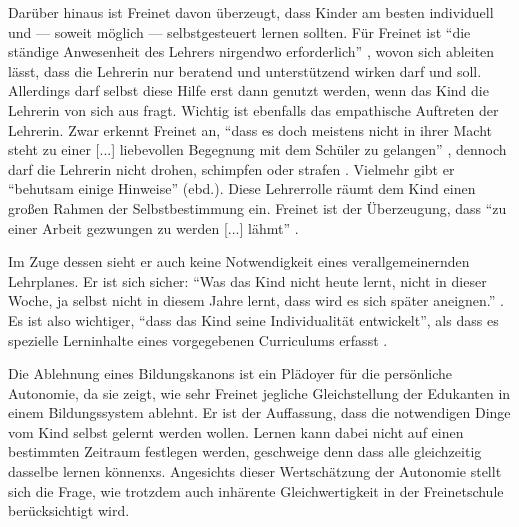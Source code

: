 Darüber hinaus ist Freinet davon überzeugt, dass Kinder am besten individuell und --- soweit möglich --- selbstgesteuert lernen sollten.
Für Freinet ist ``die ständige Anwesenheit des Lehrers nirgendwo erforderlich'' \parencite[105]{Freinet1979}, wovon sich ableiten lässt, dass die Lehrerin nur beratend und unterstützend wirken darf und soll.
Allerdings darf selbst diese Hilfe erst dann genutzt werden, wenn das Kind die Lehrerin von sich aus fragt.
Wichtig ist ebenfalls das empathische Auftreten der Lehrerin.
Zwar erkennt Freinet an, ``dass es doch meistens nicht in ihrer Macht steht zu einer [...] liebevollen Begegnung mit dem Schüler zu gelangen'' \parencite[101]{Freinet1979}, dennoch darf die Lehrerin nicht drohen, schimpfen oder strafen \parencite[103]{Freinet1979}.
Vielmehr gibt er ``behutsam einige Hinweise'' (ebd.).
Diese Lehrerrolle räumt dem Kind einen großen Rahmen der Selbstbestimmung ein.
Freinet ist der Überzeugung, dass ``zu einer Arbeit gezwungen zu werden [...] lähmt'' \parencite[vgl.][495]{Freinet-2000a}.

Im Zuge dessen sieht er auch keine Notwendigkeit eines verallgemeinernden Lehrplanes.
Er ist sich sicher: ``Was das Kind nicht heute lernt, nicht in dieser Woche, ja selbst nicht in diesem Jahre lernt, dass wird es sich später aneignen.'' \parencite[101]{Freinet1979}.
Es ist also wichtiger, ``dass das Kind seine Individualität entwickelt'', als dass es spezielle Lerninhalte eines vorgegebenen Curriculums erfasst \parencite[105]{Freinet1979}.

Die Ablehnung eines Bildungskanons ist ein Plädoyer für die persönliche Autonomie, da sie zeigt, wie sehr Freinet jegliche Gleichstellung der Edukanten in einem Bildungssystem ablehnt.
Er ist der Auffassung, dass die notwendigen Dinge vom Kind selbst gelernt werden wollen.
Lernen kann dabei nicht auf einen bestimmten Zeitraum festlegen werden, geschweige denn dass alle gleichzeitig dasselbe lernen könnenxs.
Angesichts dieser Wertschätzung der Autonomie stellt sich die Frage, wie trotzdem auch inhärente Gleichwertigkeit in der Freinetschule berücksichtigt wird.

